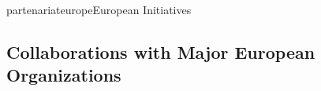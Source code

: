 \documentclass{ra2018}
\begin{document}
\begin{module}{partenariat}{europe}{European Initiatives}


\subsection{Collaborations with Major European Organizations}



\end{module}


    
\end{document}
